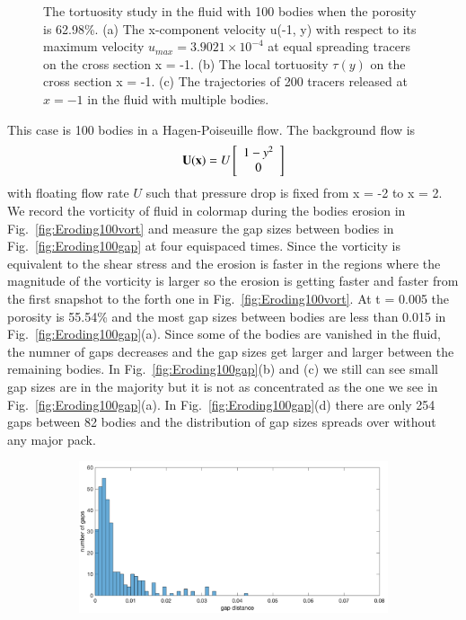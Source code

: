 \documentclass[preprint, 10pt]{elsarticle}
\begin{document}
\begin{figure}[H]
\begin{subfigure}[b]{0.5\textwidth}
\caption{}
\end{subfigure}
\caption{\label{fig:Eroding100tort} The tortuosity study in the fluid
with 100 bodies when the porosity is 62.98\%.  (a) The x-component
velocity u(-1, y) with respect to its maximum velocity $u_{max}=3.9021
\times 10^{-4}$ at equal spreading tracers on the cross section x = -1.
(b) The local tortuosity $\tau(y)$ on the cross section x = -1. (c) The
trajectories of 200 tracers released at $x = -1$ in the fluid with
multiple bodies.}
\end{figure}






{\color{red}
This case is 100 bodies in a Hagen-Poiseuille flow. The background
flow is 
\begin{align}
  {\mathbf{U}}({\mathbf{x}})=U \left[
  \begin{array}{c}
    1-y^2 \\ 0
  \end{array}
  \right]
\end{align}
with floating flow rate $U$ such that pressure drop is fixed from x = -2 to x = 2.
We record the vorticity of 
fluid in colormap during the bodies erosion in Fig.~\ref{fig:Eroding100vort} and 
measure the gap sizes between bodies in Fig.~\ref{fig:Eroding100gap} at four equispaced times.
Since the vorticity is equivalent to the shear stress and the erosion is faster in the regions where
the magnitude of the vorticity is larger 
so the erosion is getting faster and faster 
from the first snapshot to the forth one in Fig.~\ref{fig:Eroding100vort}.
At t = 0.005 the porosity is 55.54\% and the most gap sizes between bodies are less than 0.015 in 
Fig.~\ref{fig:Eroding100gap}(a). Since some of the bodies are vanished in the fluid, the numner of gaps 
decreases and the gap sizes get larger and larger between the remaining bodies. 
In Fig.~\ref{fig:Eroding100gap}(b) and (c) we still can see small gap sizes are in the majority but 
it is not as concentrated as the one we see in Fig.~\ref{fig:Eroding100gap}(a). 
In Fig.~\ref{fig:Eroding100gap}(d) there are only 254 gaps between 82 bodies and 
the distribution of gap sizes spreads over without any major pack.  
\begin{figure}[H]
\begin{subfigure}[b]{0.5\textwidth}
\includegraphics*[width =\linewidth]{./figs/gap_hist100_50}

\end{subfigure}
\end{figure}}
\end{document}
